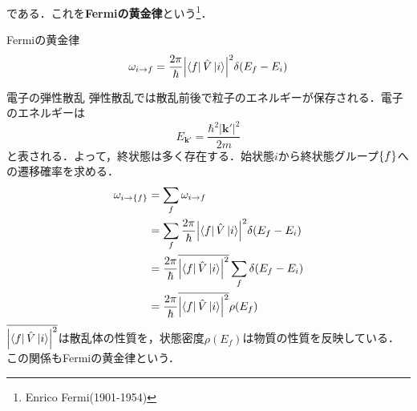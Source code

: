 \documentclass{standalone}
\begin{document}
  である．これを\textbf{Fermiの黄金律}という\footnote{Enrico Fermi(1901-1954)}．
  \begin{itembox}[l]{Fermiの黄金律}
    \begin{equation}
      \omega_{i\to f}=\frac{2\pi}{\hbar}\qty|\bra{f}\hat{V}\ket{i}|^2\delta(E_f-E_i)
    \end{equation}
  \end{itembox}
  \begin{myex}{}{}電子の弾性散乱
    弾性散乱では散乱前後で粒子のエネルギーが保存される．電子のエネルギーは
    \begin{equation}
      E_{\bm{k'}}=\frac{\hbar^2|\bm{k'}|^2}{2m}
    \end{equation}
    と表される．よって，終状態は多く存在する．始状態$i$から終状態グループ$\qty{f}$への遷移確率を求める．
    \begin{align}
      \omega_{i\to\qty{f}}&=\sum_{f}\omega_{i\to f}\\
      &=\sum_{f}\frac{2\pi}{\hbar}\qty|\bra{f}\hat{V}\ket{i}|^2\delta(E_f-E_i)\\
      &=\frac{2\pi}{\hbar}\overline{\qty|\bra{f}\hat{V}\ket{i}|^2}\sum_{f}\delta(E_f-E_i)\\
      &=\frac{2\pi}{\hbar}\overline{\qty|\bra{f}\hat{V}\ket{i}|^2}\rho(E_f)
    \end{align}
    $\overline{\qty|\bra{f}\hat{V}\ket{i}|^2}$は散乱体の性質を，状態密度$\rho(E_f)$は物質の性質を反映している．この関係もFermiの黄金律という．
  \end{myex}
\end{document}

